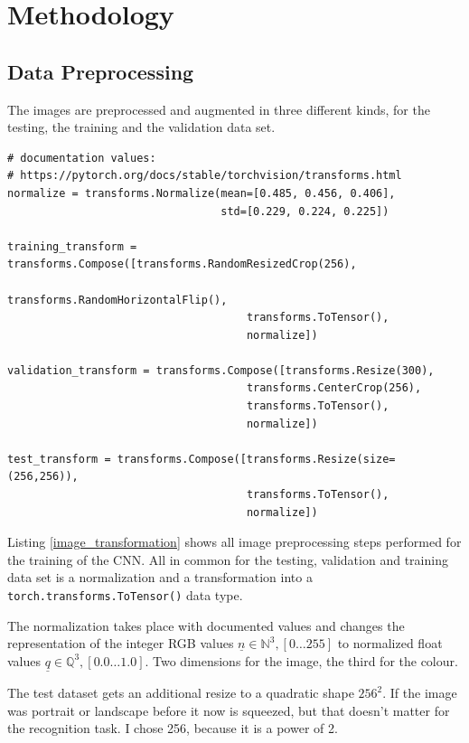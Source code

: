 \documentclass[paper=A4, DIV=10, parskip=half]{scrartcl}
\begin{document}
\section*{Methodology}

\subsection*{Data Preprocessing}

The images are preprocessed and augmented in three different kinds, for the
testing, the training and the validation data set.

\begin{lstlisting}[caption=Image Transformation, label=image_transformation]
# documentation values:
# https://pytorch.org/docs/stable/torchvision/transforms.html
normalize = transforms.Normalize(mean=[0.485, 0.456, 0.406],  
                                 std=[0.229, 0.224, 0.225])   

training_transform = transforms.Compose([transforms.RandomResizedCrop(256),
                                     transforms.RandomHorizontalFlip(),
                                     transforms.ToTensor(),
                                     normalize])

validation_transform = transforms.Compose([transforms.Resize(300),
                                     transforms.CenterCrop(256),
                                     transforms.ToTensor(),
                                     normalize])

test_transform = transforms.Compose([transforms.Resize(size=(256,256)),
                                     transforms.ToTensor(),
                                     normalize])
\end{lstlisting}

Listing \ref{image_transformation} shows all image preprocessing steps performed
for the training of the CNN. All in common for the testing, validation and
training data set is a normalization and a transformation into a
\lstinline{torch.transforms.ToTensor()} data type.

The normalization takes place with documented values and changes the
representation of the integer RGB values $\underline{n} \in \mathbb{N}^3, [0
\ldots 255]$ to normalized float values $\underline{q} \in \mathbb{Q}^3, \left[0.0
\ldots 1.0\right]$. Two dimensions for the image, the third for the colour.

The test dataset gets an additional resize to a quadratic shape $256^2$. If the
image was portrait or landscape before it now is squeezed, but that doesn't
matter for the recognition task. I chose 256, because it is a power of 2.
\end{document}
